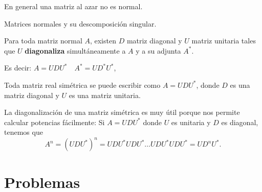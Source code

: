 En general una matriz al azar no es normal.

Matrices normales y su descomposición singular.

\begin{teorema}
Para toda matriz normal $A$, existen $D$ matriz diagonal y $U$ matriz unitaria tales que $U$ {\bf diagonaliza} simultáneamente a $A$ y a su adjunta $A^*$. 

Es decir: $A=UDU^*\quad A^*=UD^*U^*$, 
\end{teorema}

\begin{corolario}
Toda matriz real simétrica se puede escribir como $A=UDU^*$, donde $D$ es una matriz diagonal y $U$ es una matriz unitaria.
\end{corolario}

La diagonalización de una matriz simétrica es muy útil porque nos permite calcular potencias fácilmente: Si $A=UDU^*$ donde $U$ es unitaria y $D$ es diagonal, tenemos que
$$A^n=(UDU^*)^n=UDU^*UDU^*\dots UDU^*UDU^*=UD^nU^*.$$

\newpage

\section{Problemas}

